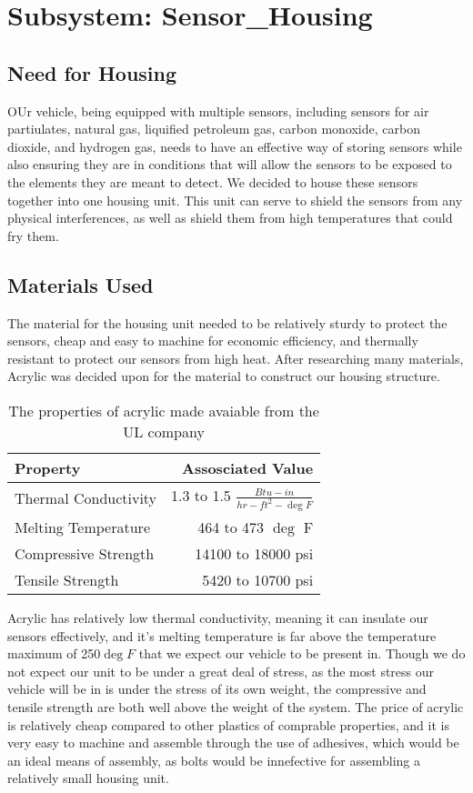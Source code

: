 \chapter{Subsystem: Sensor\_Housing}

\section{Need for Housing} OUr vehicle, being equipped with multiple sensors, including sensors for air partiulates, natural gas, liquified petroleum gas, carbon monoxide, carbon dioxide, and hydrogen gas, needs to have an effective way of storing sensors while also ensuring they are in conditions that will allow the sensors to be exposed to the elements they are meant to detect. We decided to house these sensors together into one housing unit. This unit can serve to shield the sensors from any physical interferences, as well as shield them from high temperatures that could fry them.

\section{Materials Used} The material for the housing unit needed to be relatively sturdy to protect the sensors, cheap and easy to machine for economic efficiency, and thermally resistant to protect our sensors from high heat. After researching many materials, Acrylic was decided upon for the material to construct our housing structure.

\begin{table}
\centering
\begin{tabular}{l|r}
Property & Assosciated Value \\\hline
Thermal Conductivity & 1.3 to 1.5 $\frac{Btu-in}{hr-ft^2-\deg F}$ \\
Melting Temperature & 464 to 473 $\deg$ F \\
Compressive Strength & 14100 to 18000 psi \\
Tensile Strength & 5420 to 10700 psi \\
\end{tabular}
\caption{\label{tab:Acrylic Properties} The properties of acrylic made avaiable from the UL company \cite{UL}}
\end{table}

Acrylic has relatively low thermal conductivity, meaning it can insulate our sensors effectively, and it's melting temperature is far above the temperature maximum of 250$\deg F$ that we expect our vehicle to be present in. Though we do not expect our unit to be under a great deal of stress, as the most stress our vehicle will be in is under the stress of its own weight, the compressive and tensile strength are both well above the weight of the system. The price of acrylic is relatively cheap compared to other plastics of comprable properties, and it is very easy to machine and assemble through the use of adhesives, which would be an ideal means of assembly, as bolts would be innefective for assembling a relatively small housing unit.

